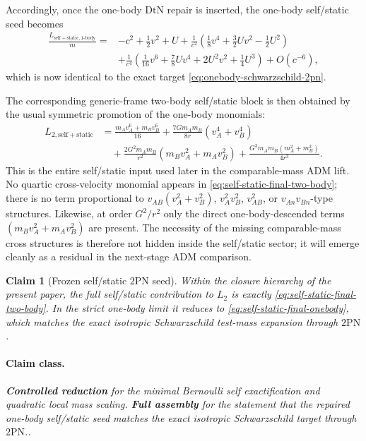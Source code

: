 \documentclass[11pt]{article}
\newcommand{\TwoPN}{\mathrm{2PN}}
\newcommand{\ADM}{\mathrm{ADM}}
\newcommand{\DtN}{\mathrm{DtN}}
\newcommand{\Controlled}{\textbf{Controlled reduction}}
\newcommand{\FullMatch}{\textbf{Full assembly}}
\newcommand{\claimclass}[1]{\paragraph{Claim class.}\emph{#1.}}
\newtheorem{claim}{Claim}
\begin{document}
Accordingly, once the one-body \(\DtN\) repair is inserted, the one-body self/static
seed becomes
\begin{align}
\frac{L_{\mathrm{self}+\mathrm{static},1\text{-}\mathrm{body}}}{m}
={}&-c^2+\frac12 v^2+U
+\frac{1}{c^2}\left(\frac18 v^4+\frac32 Uv^2-\frac12 U^2\right)
\nonumber\\
&
+\frac{1}{c^4}\left(\frac1{16}v^6+\frac78 Uv^4+2U^2v^2+\frac14 U^3\right)
+O(c^{-6}),
\label{eq:self-static-final-onebody}
\end{align}
which is now identical to the exact target
\cref{eq:onebody-schwarzschild-2pn}.

The corresponding generic-frame two-body self/static block is then obtained by the usual
symmetric promotion of the one-body monomials:
\begin{equation}
\begin{aligned}
L_{2,\mathrm{self}+\mathrm{static}}
&=\frac{m_A v_A^6+m_B v_B^6}{16}
+\frac{7Gm_A m_B}{8r}(v_A^4+v_B^4) \\
&\quad +\frac{2G^2m_A m_B}{r^2}(m_B v_A^2+m_A v_B^2)
+\frac{G^3m_A m_B(m_A^2+m_B^2)}{4r^3}.
\end{aligned}
\label{eq:self-static-final-two-body}
\end{equation}
This is the entire self/static input used later in the comparable-mass \(\ADM\) lift.
No quartic cross-velocity monomial appears in \cref{eq:self-static-final-two-body};
there is no term proportional to \(v_{AB}(v_A^2+v_B^2)\), \(v_A^2v_B^2\),
\(v_{AB}^2\), or \(v_{An}v_{Bn}\)-type structures.  Likewise, at order \(G^2/r^2\)
only the direct one-body-descended terms
\((m_B v_A^2+m_A v_B^2)\) are present.  The necessity of the missing comparable-mass
cross structures is therefore not hidden inside the self/static sector; it will emerge
cleanly as a residual in the next-stage \(\ADM\) comparison.

\begin{claim}[Frozen self/static \texorpdfstring{$2$}{2}PN seed]
\label{clm:self-static-seed}
Within the closure hierarchy of the present paper, the full self/static contribution to
\(L_2\) is exactly \cref{eq:self-static-final-two-body}.  In the strict one-body limit
it reduces to \cref{eq:self-static-final-onebody}, which matches the exact isotropic
Schwarzschild test-mass expansion through \(\TwoPN\).
\end{claim}

\claimclass{\Controlled{} for the minimal Bernoulli self exactification and quadratic
local mass scaling.
\FullMatch{} for the statement that the repaired one-body self/static seed matches the
exact isotropic Schwarzschild target through \(\TwoPN\).}
\end{document}
